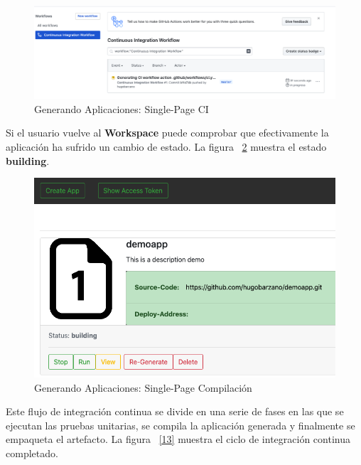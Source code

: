 \documentclass[a4paper,11pt]{book}
\begin{document}
\begin{figure}[H]
\centering
\includegraphics[scale=0.4]{imagenes/casouso_a/11.png}
\caption{  Generando Aplicaciones: Single-Page CI }
\label{11}
\end{figure}

Si el usuario vuelve al \textbf{Workspace} puede comprobar que efectivamente la aplicación ha sufrido un cambio de estado. La figura ~\ref{12} muestra el estado  \textbf{building}. 

\begin{figure}[H]
\centering
\includegraphics[scale=0.45]{imagenes/casouso_a/12.png}
\caption{ Generando Aplicaciones: Single-Page Compilación  }
\label{12}
\end{figure}


Este flujo de integración continua se divide en una serie de fases en las que se ejecutan las pruebas unitarias, se compila la aplicación generada y finalmente se empaqueta el artefacto. La figura ~\ref{13} muestra el ciclo de integración continua completado. 
\end{document}
